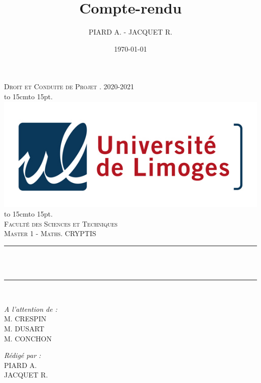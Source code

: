 \documentclass[12pt]{article}
\title{Compte-rendu}
\author{PIARD A. - JACQUET R.}
\date{\today}
\makeatletter
\let\thetitle\@title
\def\dotfill#1{\cleaders\hbox to #1{.}\hfill}
\newcommand\dotline[2][.5em]{\leavevmode\hbox to #2{\dotfill{#1}\hfil}}
\makeatother
\begin{document}
\begin{titlepage}
	\centering
    \vspace*{0.5 cm}
    \textsc{\LARGE Droit et Conduite de Projet . 2020-2021}\\[1.0 cm]
    \dotline[15pt]{15cm}\\
	\includegraphics[scale = 2.2]{logo.png}
	\dotline[15pt]{15cm}\\
	\vspace{1.5cm}
	\textsc{\Large Faculté des Sciences et Techniques}\\
	\textsc{\large Master 1 - Maths. CRYPTIS}\\[1.0 cm]
	\rule{\linewidth}{0.2 mm} \\[0.4 cm]
	{ \huge \bfseries \color{blue} \thetitle}\\
	\rule{\linewidth}{0.2 mm} \\[1.5 cm]
	
	\begin{minipage}{0.4\textwidth}
		\begin{flushleft} \large
			\emph{A l'attention de :}\\
			M. CRESPIN\\
			M. DUSART\\
			M. CONCHON\\
		\end{flushleft}
	\end{minipage}
	\begin{minipage}{0.5\textwidth}
    	\begin{flushright} \large
		\emph{Rédigé par :}\\
		PIARD A.\\
		JACQUET R.\\
		\phantom{a}\\
		\end{flushright}
	\end{minipage}\\[2 cm]
\end{titlepage}
\end{document}
